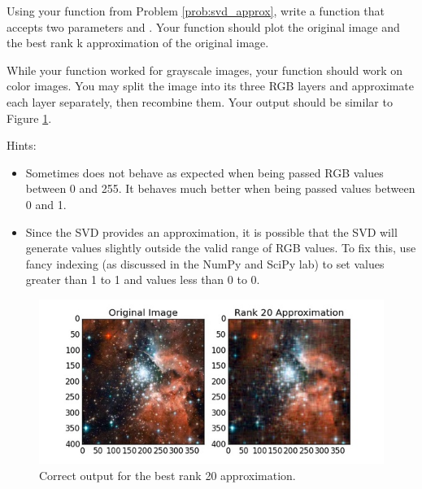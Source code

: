 \begin{problem}
Using your  function from Problem \ref{prob:svd_approx}, write a function  that accepts two parameters  and . Your function should plot the original image and the best rank k approximation of the original image. 

While your  function worked for grayscale images, your  function should work on color images. 
You may split the image into its three RGB layers and approximate each layer separately, then recombine them.
Your output should be similar to Figure \ref{fig:compressed_image}.

Hints:
\begin{itemize}
\item Sometimes  does not behave as expected when being passed RGB values between 0 and 255. It behaves much better when being passed values between 0 and 1. 
\item Since the SVD provides an approximation, it is possible that the SVD will generate values slightly outside the valid range of RGB values. 
To fix this, use fancy indexing (as discussed in the NumPy and SciPy lab) to set values greater than 1 to 1 and values less than 0 to 0. 
\end{itemize}

\begin{figure}[H]
\includegraphics[width=\textwidth]{compressed.jpg}
\caption{Correct output for the best rank 20 approximation.}
\label{fig:compressed_image}
\end{figure}
\end{problem}
